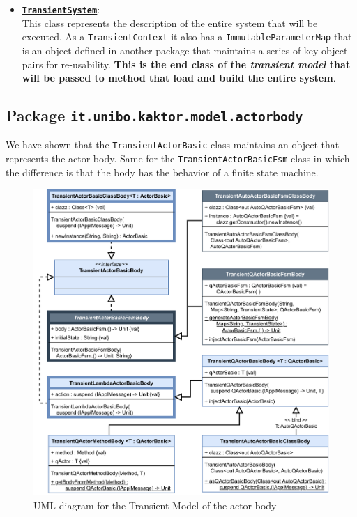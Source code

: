 \begin{itemize}
	\item 
	\href{https://github.com/LM-96/QA-Extensions/blob/main/it.unibo.qakactor/src/main/kotlin/model/TransientSystem.kt}{\underline{\textbf{\texttt{TransientSystem}}}}:\\
	This class represents the description of the entire system that will be executed. As a \texttt{TransientContext} it also has a \texttt{ImmutableParameterMap} that is an object defined in another package that maintains a series of key-object pairs for re-usability.
	\textbf{This is the end class of the \textit{transient model} that will be passed to method that load and build the entire system}.
\end{itemize}

\subsection{Package \texttt{it.unibo.kaktor.model.actorbody}}

We have shown that the \texttt{TransientActorBasic} class maintains an object that represents the actor body. Same for the \texttt{TransientActorBasicFsm} class in which the difference is that the body has the behavior of a finite state machine.

\begin{figure}[h]
	\centering
	\includegraphics[width=\textwidth]{img/[UML]it.unibo.kaktor.model.actorbody_onlyactorbody}
	\caption{UML diagram for the Transient Model of the actor body}
	\label{fig::uml_model_body}
\end{figure}

